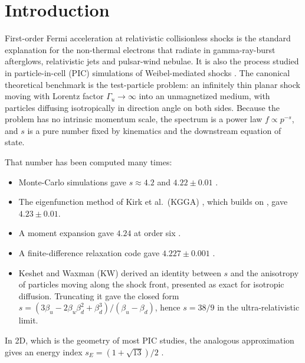 \documentclass[aps,prd,twocolumn,superscriptaddress,nofootinbib,floatfix]{revtex4-2}
\newcommand{\bd}{\beta_d}
\newcommand{\bu}{\beta_u}
\begin{document}
\maketitle

\section{Introduction}

First-order Fermi acceleration at relativistic collisionless shocks is the standard explanation for the
non-thermal electrons that radiate in gamma-ray-burst afterglows, relativistic jets and pulsar-wind nebulae.
It is also the process studied in particle-in-cell (PIC) simulations of Weibel-mediated shocks
\cite{Spitkovsky2008,SironiSpitkovskyArons2013,SironiKeshetLemoine2015}. The canonical theoretical benchmark is
the test-particle problem: an infinitely thin planar shock moving with Lorentz factor $\Gamma_u\to\infty$ into an
unmagnetized medium, with particles diffusing isotropically in direction angle on both sides. Because the
problem has no intrinsic momentum scale, the spectrum is a power law $f\propto p^{-s}$, and $s$ is a pure number
fixed by kinematics and the downstream equation of state.

That number has been computed many times:
\begin{itemize}
\item Monte-Carlo simulations gave $s\approx4.2$ \cite{BednarzOstrowski1998} and $4.22\pm0.01$
  \cite{Achterberg2001}.
\item The eigenfunction method of Kirk et al.\ (KGGA) \cite{KGGA2000}, which builds on
  \cite{KirkSchneider1987,HeavensDrury1988}, gave $4.23\pm0.01$.
\item A moment expansion gave $4.24$ at order six \cite{Keshet2006}.
\item A finite-difference relaxation code gave $4.227\pm0.001$ \cite{NagarKeshet2021}.
\item Keshet and Waxman (KW) \cite{KeshetWaxman2005} derived an identity between $s$ and the anisotropy of
  particles moving along the shock front, presented as exact for isotropic diffusion. Truncating it gave the
  closed form $s=(3\bu-2\bu\bd^2+\bd^3)/(\bu-\bd)$, hence $s=38/9$ in the ultra-relativistic limit.
\end{itemize}
In 2D, which is the geometry of most PIC studies, the analogous approximation gives an energy index
$s_E=(1+\sqrt{13})/2$ \cite{Lavi2020,NagarKeshet2021}.
\end{document}
